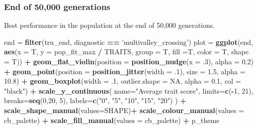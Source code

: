 \documentclass[]{book}
\newenvironment{Shaded}{\begin{snugshade}}{\end{snugshade}}
\newcommand{\DataTypeTok}[1]{\textcolor[rgb]{0.13,0.29,0.53}{#1}}
\newcommand{\DecValTok}[1]{\textcolor[rgb]{0.00,0.00,0.81}{#1}}
\newcommand{\FloatTok}[1]{\textcolor[rgb]{0.00,0.00,0.81}{#1}}
\newcommand{\KeywordTok}[1]{\textcolor[rgb]{0.13,0.29,0.53}{\textbf{#1}}}
\newcommand{\NormalTok}[1]{#1}
\newcommand{\OperatorTok}[1]{\textcolor[rgb]{0.81,0.36,0.00}{\textbf{#1}}}
\newcommand{\OtherTok}[1]{\textcolor[rgb]{0.56,0.35,0.01}{#1}}
\newcommand{\StringTok}[1]{\textcolor[rgb]{0.31,0.60,0.02}{#1}}
\begin{document}
\hypertarget{end-of-50000-generations-12}{%
\subsubsection{End of 50,000 generations}\label{end-of-50000-generations-12}}

Best performance in the population at the end of 50,000 generations.

\begin{Shaded}
\begin{Highlighting}[]
\NormalTok{end =}\StringTok{ }\KeywordTok{filter}\NormalTok{(tru_end, diagnostic }\OperatorTok{==}\StringTok{ 'multivalley_crossing'}\NormalTok{)}
\NormalTok{plot =}\StringTok{ }\KeywordTok{ggplot}\NormalTok{(end, }\KeywordTok{aes}\NormalTok{(}\DataTypeTok{x =}\NormalTok{ T, }\DataTypeTok{y =}\NormalTok{ pop_fit_max }\OperatorTok{/}\StringTok{ }\NormalTok{TRAITS, }\DataTypeTok{group =}\NormalTok{ T, }\DataTypeTok{fill =}\NormalTok{T, }\DataTypeTok{color =}\NormalTok{ T, }\DataTypeTok{shape =}\NormalTok{ T)) }\OperatorTok{+}
\StringTok{  }\KeywordTok{geom_flat_violin}\NormalTok{(}\DataTypeTok{position =} \KeywordTok{position_nudge}\NormalTok{(}\DataTypeTok{x =} \FloatTok{.3}\NormalTok{), }\DataTypeTok{alpha =} \FloatTok{0.2}\NormalTok{) }\OperatorTok{+}
\StringTok{  }\KeywordTok{geom_point}\NormalTok{(}\DataTypeTok{position =} \KeywordTok{position_jitter}\NormalTok{(}\DataTypeTok{width =} \FloatTok{.1}\NormalTok{), }\DataTypeTok{size =} \FloatTok{1.5}\NormalTok{, }\DataTypeTok{alpha =} \FloatTok{10.8}\NormalTok{) }\OperatorTok{+}
\StringTok{  }\KeywordTok{geom_boxplot}\NormalTok{(}\DataTypeTok{width =} \FloatTok{.1}\NormalTok{, }\DataTypeTok{outlier.shape =} \OtherTok{NA}\NormalTok{, }\DataTypeTok{alpha =} \FloatTok{0.1}\NormalTok{, }\DataTypeTok{col =} \StringTok{"black"}\NormalTok{) }\OperatorTok{+}
\StringTok{  }\KeywordTok{scale_y_continuous}\NormalTok{(}
    \DataTypeTok{name=}\StringTok{"Average trait score"}\NormalTok{,}
    \DataTypeTok{limits=}\KeywordTok{c}\NormalTok{(}\OperatorTok{-}\DecValTok{1}\NormalTok{, }\DecValTok{21}\NormalTok{),}
    \DataTypeTok{breaks=}\KeywordTok{seq}\NormalTok{(}\DecValTok{0}\NormalTok{,}\DecValTok{20}\NormalTok{, }\DecValTok{5}\NormalTok{),}
    \DataTypeTok{labels=}\KeywordTok{c}\NormalTok{(}\StringTok{"0"}\NormalTok{, }\StringTok{"5"}\NormalTok{, }\StringTok{"10"}\NormalTok{, }\StringTok{"15"}\NormalTok{, }\StringTok{"20"}\NormalTok{)}
\NormalTok{  ) }\OperatorTok{+}
\StringTok{  }\KeywordTok{scale_shape_manual}\NormalTok{(}\DataTypeTok{values=}\NormalTok{SHAPE)}\OperatorTok{+}
\StringTok{  }\KeywordTok{scale_colour_manual}\NormalTok{(}\DataTypeTok{values =}\NormalTok{ cb_palette) }\OperatorTok{+}
\StringTok{  }\KeywordTok{scale_fill_manual}\NormalTok{(}\DataTypeTok{values =}\NormalTok{ cb_palette) }\OperatorTok{+}
\StringTok{  }\NormalTok{p_theme}


\end{Highlighting}
\end{Shaded}
\end{document}
